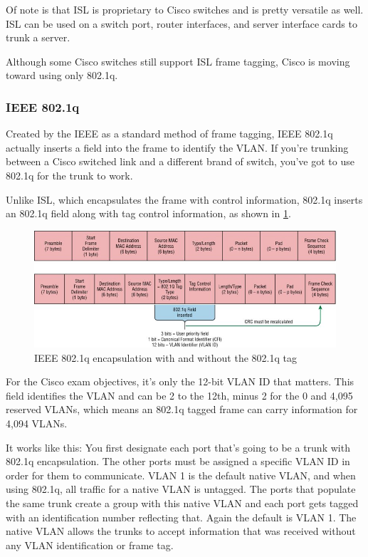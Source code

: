 Of note is that ISL is proprietary to Cisco switches and is pretty
versatile as well. ISL can be used on a switch port, router interfaces,
and server interface cards to trunk a server.

Although some Cisco switches still support ISL frame tagging, Cisco is moving toward using only 802.1q.

\subsubsection{IEEE 802.1q}

Created by the IEEE as a standard method of frame tagging, IEEE 802.1q actually inserts a field into the frame to identify the VLAN.
If you're trunking between a Cisco switched link and a different brand of switch, you've got to use 802.1q for the trunk to work.

Unlike ISL, which encapsulates the frame with control information, 802.1q inserts an 802.1q field along with tag control information, as
shown in \cref{fig:802.1q-encapsulation}.


\begin{figure}
   \centering
   \includegraphics[width=.7\textwidth]{images/c11f007.jpg}
   \caption{IEEE 802.1q encapsulation with and without the 802.1q tag}
   \label{fig:802.1q-encapsulation}
\end{figure}


For the Cisco exam objectives, it's only the 12-bit VLAN ID that
matters. This field identifies the VLAN and can be 2 to the 12th, minus
2 for the 0 and 4,095 reserved VLANs, which means an 802.1q tagged frame
can carry information for 4,094 VLANs.

It works like this: You first designate each port that's going to be a
trunk with 802.1q encapsulation. The other ports must be assigned a
specific VLAN ID in order for them to communicate. VLAN 1 is the default
native VLAN, and when using 802.1q, all traffic for a native VLAN is
untagged. The ports that populate the same trunk create a group with
this native VLAN and each port gets tagged with an identification number
reflecting that. Again the default is VLAN 1. The native VLAN allows the
trunks to accept information that was received without any VLAN
identification or frame tag.

